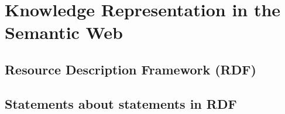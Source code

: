 \section{Knowledge Representation in the Semantic Web}
\label{sec:chp2_semweb}

\subsection{Resource Description Framework (RDF)}

\subsection{Statements about statements in RDF}
